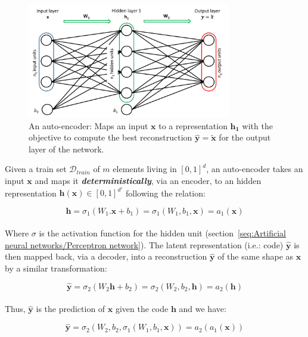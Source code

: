 \documentclass[a4paper,11pt]{report}
\newcommand{\Important}[1]{\textbf{{\em #1}}}
\begin{document}
		\begin{figure}[H]
			\begin{center}
				\includegraphics[width=3.5in]{Images/AE_SAE/AE.pdf}
				\caption[An auto-encoder]{An auto-encoder: Maps an input $\mathbf{x}$ to a representation $\mathbf{h_{1}}$ with the objective to compute the best reconstruction $\mathbf{\hat{y}} = \mathbf{\tilde{x}}$ for the output layer of the network.}
				\label{fig:AE}
			\end{center}
		\end{figure}
				
		Given a train set $\mathcal{D}_{train}$ of $m$ elements living in $[0,1]^{d}$, an auto-encoder takes an input $\mathbf{x}$ and maps it \Important{deterministically}, via an encoder, to an hidden representation $\mathbf{h(x)} \in [0,1]^{d'}$ following the relation:
		
		\begin{equation}
				\mathbf{h} = \sigma_{1}(W_{1}.\mathbf{x} + b_{1}) = \sigma_{1}(W_{1},b_{1},\mathbf{x}) = a_{1}(\mathbf{x})
		\end{equation}\\
		
		Where $\sigma$ is the activation function for the hidden unit (section~\ref{seq:Artificial neural networks/Perceptron network}). The latent representation (i.e.: code) $\mathbf{\hat{y}}$ is then mapped back, via a decoder, into a reconstruction $\mathbf{\hat{y}}$ of the same shape as $\mathbf{x}$ by a similar transformation:
		
		\begin{equation}
				\mathbf{\hat{y}} = \sigma_{2}(W_{2} \mathbf{h} + b_{2}) = \sigma_{2}(W_{2},b_{2},\mathbf{h}) = a_{2}(\mathbf{h})
		\end{equation}\\
		
		Thus, $\mathbf{\hat{y}}$ is the prediction of $\mathbf{x}$ given the code $\mathbf{h}$ and we have:
		
		\begin{equation}
				\mathbf{\hat{y}} = \sigma_{2}(W_{2}, b_{2}, \sigma_{1}(W_{1}, b_{1}, \mathbf{x})) = a_{2}(a_{1}(\mathbf{x}))
		\end{equation}\\
\end{document}
